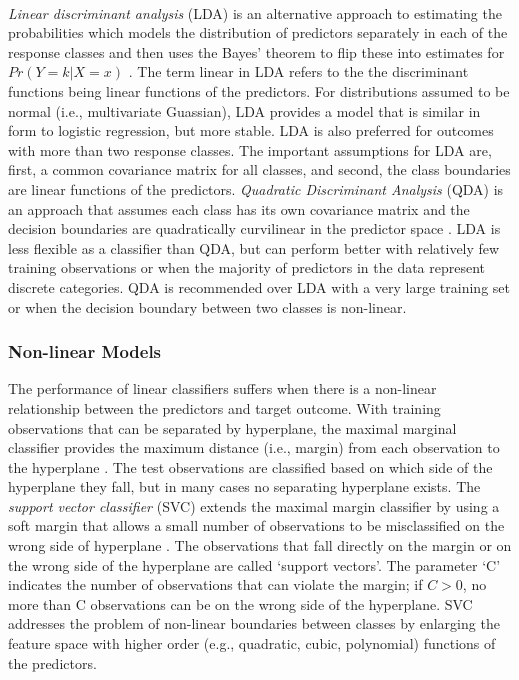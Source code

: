 \\\documentclass[sigconf]{acmart}
\begin{document}
\emph{Linear discriminant analysis} (LDA) is an alternative approach to 
estimating the probabilities which models the distribution of predictors 
separately in each of the response classes and then uses the Bayes' theorem 
to flip these into estimates for $Pr(Y=k | X=x)$ \cite{james13}. The term 
linear in LDA refers to the the discriminant functions being linear functions 
of the predictors. For distributions assumed to be normal (i.e., multivariate 
Guassian), LDA provides a model that is similar in form to logistic regression, 
but more stable. LDA is also preferred for outcomes with more than two response 
classes. The important assumptions for LDA are, first, a common covariance 
matrix for all classes, and second, the class boundaries are linear functions 
of the predictors. \emph{Quadratic Discriminant Analysis} (QDA) is an approach 
that assumes each class has its own covariance matrix and the decision 
boundaries are quadratically curvilinear in the predictor space \cite{kuhn13}. 
LDA is less flexible as a classifier than QDA, but can perform better with 
relatively few training observations or when the majority of predictors in the 
data represent discrete categories. QDA is recommended over LDA with a very 
large training set or when the decision boundary between two classes is 
non-linear. 


\subsubsection{Non-linear Models}

The performance of linear classifiers suffers when there is a non-linear 
relationship between the predictors and target outcome. With training
observations that can be separated by hyperplane, the maximal marginal 
classifier provides the maximum distance (i.e., margin) from each observation
to the hyperplane \cite{james13}. The test observations are classified based 
on which side of the hyperplane they fall, but in many cases no separating 
hyperplane exists. The \emph{support vector classifier} (SVC) extends the 
maximal margin classifier by using a soft margin that allows a small number 
of observations to be misclassified on the wrong side of hyperplane 
\cite{kuhn13, cortes95}. The observations that fall directly on the margin or 
on the wrong side of the hyperplane are called `support vectors'. The parameter 
`C' indicates the number of observations that can violate the margin; if $C>0$, 
no more than C observations can be on the wrong side of the hyperplane. 
SVC addresses the problem of non-linear boundaries between classes by 
enlarging the feature space with higher order (e.g., quadratic, cubic, 
polynomial) functions of the predictors. 
\end{document}
